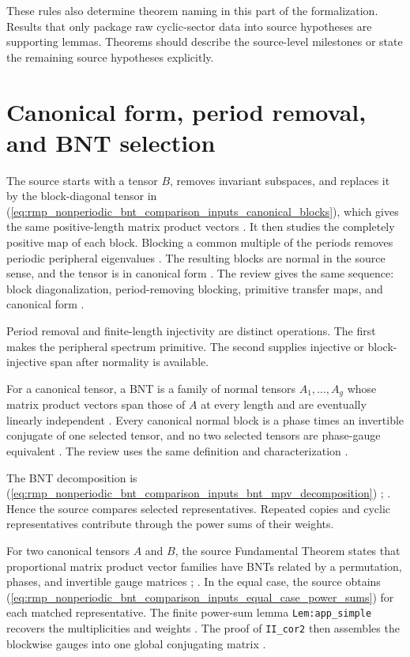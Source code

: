 \documentclass{article}
\begin{document}
These rules also determine theorem naming in this part of the formalization.
Results that only package raw cyclic-sector data into source hypotheses are
supporting lemmas. Theorems should describe the source-level milestones or
state the remaining source hypotheses explicitly.

\section{Canonical form, period removal, and BNT selection}

The source starts with a tensor $B$, removes invariant subspaces, and replaces
it by the block-diagonal tensor in
(\ref{eq:rmp_nonperiodic_bnt_comparison_inputs_canonical_blocks}), which gives
the same positive-length matrix product vectors
\cite[lines~214--225]{Cirac2016MPDO_arXiv}. It then studies the completely
positive map of each block. Blocking a common multiple of the periods removes
periodic peripheral eigenvalues
\cite[lines~227--231]{Cirac2016MPDO_arXiv}. The resulting blocks are normal in
the source sense, and the tensor is in canonical form
\cite[lines~233--255]{Cirac2016MPDO_arXiv}. The review gives the same sequence:
block diagonalization, period-removing blocking, primitive transfer maps, and
canonical form \cite[lines~1793--1839]{Cirac2021Matrix}.

Period removal and finite-length injectivity are distinct operations. The first
makes the peripheral spectrum primitive. The second supplies injective or
block-injective span after normality is available.

For a canonical tensor, a BNT is a family of normal tensors
$A_1,\ldots,A_g$ whose matrix product vectors span those of $A$ at every
length and are eventually linearly independent
\cite[lines~271--274]{Cirac2016MPDO_arXiv}. Every canonical normal block is a
phase times an invertible conjugate of one selected tensor, and no two selected
tensors are phase-gauge equivalent
\cite[lines~278--280]{Cirac2016MPDO_arXiv}. The review uses the same definition
and characterization \cite[lines~1846--1859]{Cirac2021Matrix}.

The BNT decomposition is
(\ref{eq:rmp_nonperiodic_bnt_comparison_inputs_bnt_mpv_decomposition})
\cite[lines~283--302]{Cirac2016MPDO_arXiv};
\cite[lines~1864--1885]{Cirac2021Matrix}. Hence the source compares selected
representatives. Repeated copies and cyclic representatives contribute through
the power sums of their weights.

For two canonical tensors $A$ and $B$, the source Fundamental Theorem states
that proportional matrix product vector families have BNTs related by a
permutation, phases, and invertible gauge matrices
\cite[lines~347--352]{Cirac2016MPDO_arXiv};
\cite[lines~1890--1900]{Cirac2021Matrix}. In the equal case, the source obtains
(\ref{eq:rmp_nonperiodic_bnt_comparison_inputs_equal_case_power_sums}) for each
matched representative. The finite power-sum lemma
\texttt{Lem:app\_simple} recovers the multiplicities and weights
\cite[lines~1155--1163]{Cirac2016MPDO_arXiv}. The proof of
\texttt{II\_cor2} then assembles the blockwise gauges into one global
conjugating matrix \cite[lines~1184--1192]{Cirac2016MPDO_arXiv}.
\end{document}
